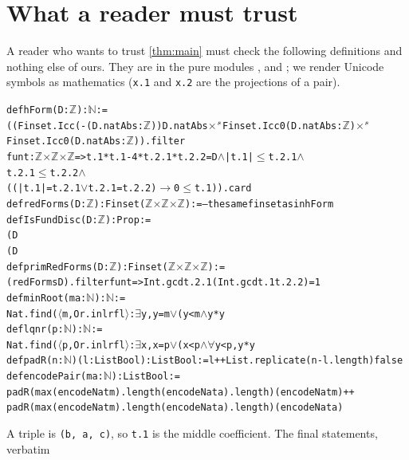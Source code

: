 \documentclass[10pt]{amsart}
\theoremstyle{plain}
\theoremstyle{definition}
\theoremstyle{remark}
\numberwithin{equation}{section}
\begin{document}
\section{What a reader must trust}\label{sec:statement}

A reader who wants to trust \cref{thm:main} must check the following definitions and nothing else of
ours. They are in the pure modules ,  and ; we render Unicode
symbols as mathematics (\verb|x.1| and \verb|x.2| are the projections of a pair).
\begin{alltt}\footnotesize
def hForm (D : \(\mathbb{Z}\)) : \(\mathbb{N}\) :=
  ((Finset.Icc (-(D.natAbs : \(\mathbb{Z}\))) D.natAbs \(\times\)\(\sp{s}\) Finset.Icc 0 (D.natAbs : \(\mathbb{Z}\)) \(\times\)\(\sp{s}\)
      Finset.Icc 0 (D.natAbs : \(\mathbb{Z}\))).filter
    fun t : \(\mathbb{Z}\) \(\times\) \(\mathbb{Z}\) \(\times\) \(\mathbb{Z}\) => t.1 * t.1 - 4 * t.2.1 * t.2.2 = D \(\wedge\) |t.1| \(\le\) t.2.1 \(\wedge\)
      t.2.1 \(\le\) t.2.2 \(\wedge\)
      ((|t.1| = t.2.1 \(\vee\) t.2.1 = t.2.2) \(\to\) 0 \(\le\) t.1)).card
def redForms (D : \(\mathbb{Z}\)) : Finset (\(\mathbb{Z}\) \(\times\) \(\mathbb{Z}\) \(\times\) \(\mathbb{Z}\)) := -- the same finset as in hForm
def IsFundDisc (D : \(\mathbb{Z}\)) : Prop :=
  (D %
    (D %
def primRedForms (D : \(\mathbb{Z}\)) : Finset (\(\mathbb{Z}\) \(\times\) \(\mathbb{Z}\) \(\times\) \(\mathbb{Z}\)) :=
  (redForms D).filter fun t => Int.gcd t.2.1 (Int.gcd t.1 t.2.2) = 1
def minRoot (m a : \(\mathbb{N}\)) : \(\mathbb{N}\) :=
  Nat.find (\(\langle\)m, Or.inl rfl\(\rangle\) : \(\exists\) y, y = m \(\vee\) (y < m \(\wedge\) y * y %
def lqnr (p : \(\mathbb{N}\)) : \(\mathbb{N}\) :=
  Nat.find (\(\langle\)p, Or.inl rfl\(\rangle\) : \(\exists\) x, x = p \(\vee\) (x < p \(\wedge\) \(\forall\) y < p, y * y %
def padR (n : \(\mathbb{N}\)) (l : List Bool) : List Bool := l ++ List.replicate (n - l.length) false
def encodePair (m a : \(\mathbb{N}\)) : List Bool :=
  padR (max (encodeNat m).length (encodeNat a).length) (encodeNat m) ++
    padR (max (encodeNat m).length (encodeNat a).length) (encodeNat a)
\end{alltt}
A triple is \texttt{(b, a, c)}, so \texttt{t.1} is the middle coefficient. The final statements, verbatim
\end{document}
